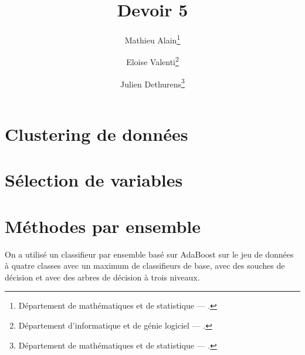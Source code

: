\documentclass[french, twoside=semi, headings=normal]{scrartcl}
\title{Devoir 5}
\author{Mathieu Alain\thanks{Département de mathématiques et de statistique --- \mailmathieu.} \and Eloise Valenti\thanks{Département d'informatique et de génie logiciel --- \mailelo.} \and Julien Dethurens\thanks{Département de mathématiques et de statistique --- \mailjulien.}}
\begin{document}
\maketitle

\section{Clustering de données}

\section{Sélection de variables}

\section{Méthodes par ensemble}

On a utilisé un classifieur par ensemble basé sur AdaBoost sur le jeu de données à quatre classes avec un maximum de  classifieurs de base, avec des souches de décision et avec des arbres de décision à trois niveaux.
\end{document}
